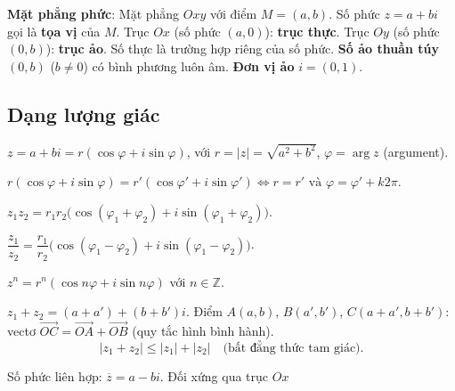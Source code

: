 \documentclass[12pt,a4paper]{article}
\begin{document}
\begin{dinhnghia}
  \textbf{Mặt phẳng phức}: Mặt phẳng $Oxy$ với điểm $M = (a, b)$. Số phức $z = a + bi$ gọi là \textbf{tọa vị} của $M$. Trục $Ox$ (số phức $(a, 0)$): \textbf{trục thực}. Trục $Oy$ (số phức $(0, b)$): \textbf{trục ảo}. Số thực là trường hợp riêng của số phức. \textbf{Số ảo thuần túy} $(0, b)$ ($b \ne 0$) có bình phương luôn âm. \textbf{Đơn vị ảo} $i = (0, 1)$.
\end{dinhnghia}

\subsection{Dạng lượng giác}

\begin{dinhnghia}
  $z = a + bi = r(\cos\varphi + i\sin\varphi)$, với $r = |z| = \sqrt{a^2 + b^2}$, $\varphi = \arg z$ (argument).
\end{dinhnghia}

\begin{tinhchat}
  $r(\cos\varphi + i\sin\varphi) = r'(\cos\varphi' + i\sin\varphi') \Leftrightarrow r = r' \text{ và } \varphi = \varphi' + k2\pi$.
\end{tinhchat}

\begin{congthuc}[title={Nhân và chia}]
  $z_1 z_2 = r_1 r_2\bigl(\cos(\varphi_1 + \varphi_2) + i\sin(\varphi_1 + \varphi_2)\bigr)$.
  
  $\dfrac{z_1}{z_2} = \dfrac{r_1}{r_2}\bigl(\cos(\varphi_1 - \varphi_2) + i\sin(\varphi_1 - \varphi_2)\bigr)$.
\end{congthuc}

\begin{congthuc}[title={Công thức Moivre}]
  $z^n = r^n(\cos n\varphi + i\sin n\varphi)$ với $n \in \mathbb{Z}$.
\end{congthuc}

\begin{congthuc}[title={Tổng và bất đẳng thức tam giác}]
  $z_1 + z_2 = (a + a') + (b + b')i$. Điểm $A(a, b)$, $B(a', b')$, $C(a + a', b + b')$: vectơ $\overrightarrow{OC} = \overrightarrow{OA} + \overrightarrow{OB}$ (quy tắc hình bình hành).
  \[
    |z_1 + z_2| \le |z_1| + |z_2| \quad \text{(bất đẳng thức tam giác)}.
  \]
\end{congthuc}

\begin{dinhnghia}
  Số phức liên hợp: $\overline{z} = a - bi$. Đối xứng qua trục $Ox$
\end{dinhnghia}
\end{document}

